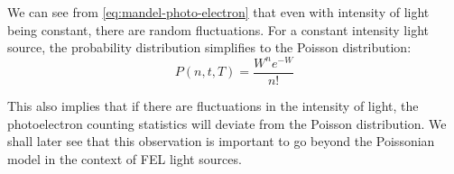 We can see from \ref{eq:mandel-photo-electron} that even with intensity of light being constant, there are random fluctuations. For a constant intensity light source, the probability distribution simplifies to the Poisson distribution:
\begin{equation}
    P(n, t, T) = \frac{W^n e^{-W}}{n!} 
\end{equation}

This also implies that if there are fluctuations in the intensity of light, the photoelectron counting statistics will deviate from the Poisson distribution. We shall later see that this observation is important to go beyond the Poissonian model in the context of \gls{FEL} light sources.





